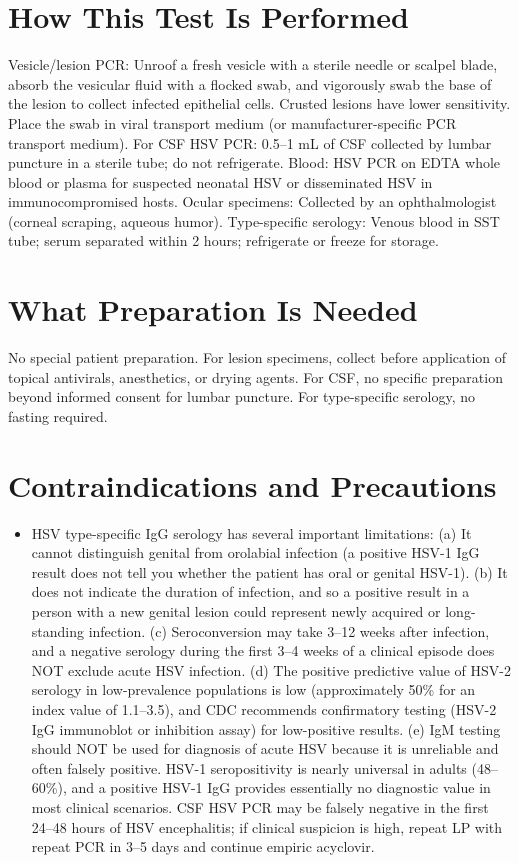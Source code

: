 \section*{How This Test Is Performed}
Vesicle/lesion PCR: Unroof a fresh vesicle with a sterile needle or scalpel blade, absorb the vesicular fluid with a flocked swab, and vigorously swab the base of the lesion to collect infected epithelial cells. Crusted lesions have lower sensitivity. Place the swab in viral transport medium (or manufacturer-specific PCR transport medium). For CSF HSV PCR: 0.5--1 mL of CSF collected by lumbar puncture in a sterile tube; do not refrigerate. Blood: HSV PCR on EDTA whole blood or plasma for suspected neonatal HSV or disseminated HSV in immunocompromised hosts. Ocular specimens: Collected by an ophthalmologist (corneal scraping, aqueous humor). Type-specific serology: Venous blood in SST tube; serum separated within 2 hours; refrigerate or freeze for storage.

\section*{What Preparation Is Needed}
No special patient preparation. For lesion specimens, collect before application of topical antivirals, anesthetics, or drying agents. For CSF, no specific preparation beyond informed consent for lumbar puncture. For type-specific serology, no fasting required.

\section*{Contraindications and Precautions}
\begin{itemize}
  \item HSV type-specific IgG serology has several important limitations: (a) It cannot distinguish genital from orolabial infection (a positive HSV-1 IgG result does not tell you whether the patient has oral or genital HSV-1). (b) It does not indicate the duration of infection, and so a positive result in a person with a new genital lesion could represent newly acquired or long-standing infection. (c) Seroconversion may take 3--12 weeks after infection, and a negative serology during the first 3--4 weeks of a clinical episode does NOT exclude acute HSV infection. (d) The positive predictive value of HSV-2 serology in low-prevalence populations is low (approximately 50\% for an index value of 1.1--3.5), and CDC recommends confirmatory testing (HSV-2 IgG immunoblot or inhibition assay) for low-positive results. (e) IgM testing should NOT be used for diagnosis of acute HSV because it is unreliable and often falsely positive. HSV-1 seropositivity is nearly universal in adults (48--60\%), and a positive HSV-1 IgG provides essentially no diagnostic value in most clinical scenarios. CSF HSV PCR may be falsely negative in the first 24--48 hours of HSV encephalitis; if clinical suspicion is high, repeat LP with repeat PCR in 3--5 days and continue empiric acyclovir.
\end{itemize}
